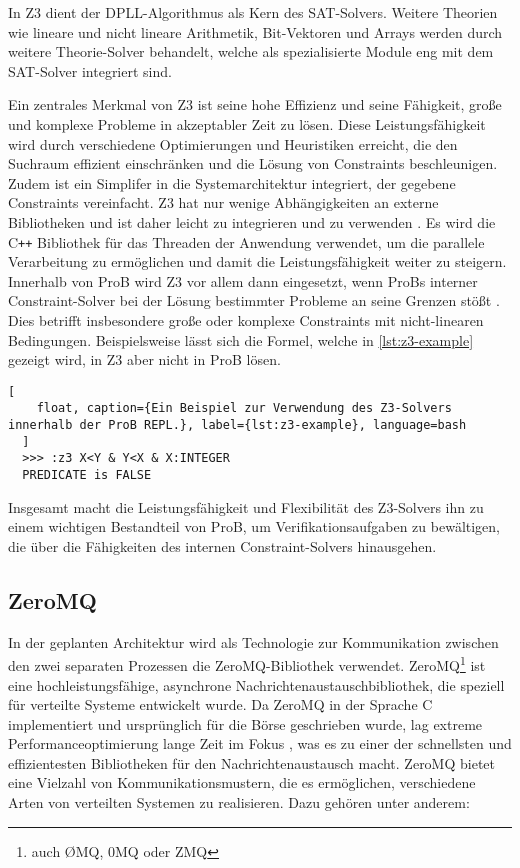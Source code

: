 In Z3 dient der DPLL-Algorithmus als Kern des SAT-Solvers.
Weitere Theorien wie lineare und nicht lineare Arithmetik, Bit-Vektoren und Arrays werden durch weitere Theorie-Solver behandelt,
welche als spezialisierte Module eng mit dem SAT-Solver integriert sind.

Ein zentrales Merkmal von Z3 ist seine hohe Effizienz und seine Fähigkeit,
große und komplexe Probleme in akzeptabler Zeit zu lösen.
Diese Leistungsfähigkeit wird durch verschiedene Optimierungen und Heuristiken erreicht,
die den Suchraum effizient einschränken und die Lösung von Constraints beschleunigen.
Zudem ist ein Simplifer in die Systemarchitektur integriert, der gegebene Constraints vereinfacht.
Z3 hat nur wenige Abhängigkeiten an externe Bibliotheken und ist daher leicht zu integrieren und zu verwenden \cite{z3prover-github}.
Es wird die C\texttt{++} Bibliothek für das Threaden der Anwendung verwendet, um die parallele Verarbeitung zu ermöglichen und damit die Leistungsfähigkeit weiter zu steigern.
\clearpage
Innerhalb von ProB wird Z3 vor allem dann eingesetzt, wenn ProBs interner Constraint-Solver bei der Lösung bestimmter Probleme an seine Grenzen stößt \cite{10.1007/978-3-319-33693-0_23}.
Dies betrifft insbesondere große oder komplexe Constraints mit nicht-linearen Bedingungen.
Beispielsweise lässt sich die Formel, welche in \cref{lst:z3-example} gezeigt wird, in Z3 aber nicht in ProB lösen.

\begin{lstlisting}[
    float, caption={Ein Beispiel zur Verwendung des Z3-Solvers innerhalb der ProB REPL.}, label={lst:z3-example}, language=bash
  ]
  >>> :z3 X<Y & Y<X & X:INTEGER
  PREDICATE is FALSE
\end{lstlisting}

Insgesamt macht die Leistungsfähigkeit und Flexibilität des Z3-Solvers ihn zu einem wichtigen Bestandteil von ProB,
um Verifikationsaufgaben zu bewältigen, die über die Fähigkeiten des internen Constraint-Solvers hinausgehen.

\subsection{ZeroMQ}
\label{sec:zeromq}

In der geplanten Architektur wird als Technologie zur Kommunikation zwischen den zwei separaten Prozessen die ZeroMQ-Bibliothek \cite{hintjens2013zeromq} verwendet.
ZeroMQ\footnote{auch ØMQ, 0MQ oder ZMQ} ist eine hochleistungsfähige, asynchrone Nachrichtenaustauschbibliothek, die speziell für verteilte Systeme entwickelt wurde.
Da ZeroMQ in der Sprache C implementiert und ursprünglich für die Börse geschrieben wurde, lag extreme Performanceoptimierung lange Zeit im Fokus \cite{sustrik2015zeromq},
was es zu einer der schnellsten und effizientesten Bibliotheken für den Nachrichtenaustausch macht.
ZeroMQ bietet eine Vielzahl von Kommunikationsmustern, die es ermöglichen, verschiedene Arten von verteilten Systemen zu realisieren.
Dazu gehören unter anderem:


